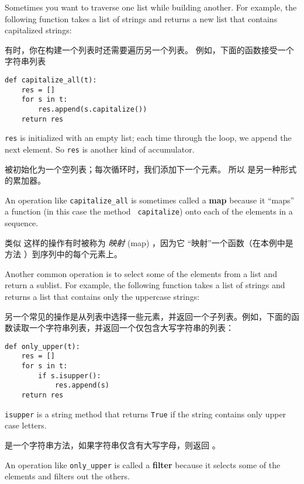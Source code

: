 Sometimes you want to traverse one list while building
another.  For example, the following function takes a list of strings
and returns a new list that contains capitalized strings:

有时，你在构建一个列表时还需要遍历另一个列表。  例如，下面的函数接受一个字符串列表

\begin{lstlisting}
def capitalize_all(t):
    res = []
    for s in t:
        res.append(s.capitalize())
    return res
\end{lstlisting}

%
{\tt res} is initialized with an empty list; each time through
the loop, we append the next element.  So {\tt res} is another
kind of accumulator.

 被初始化为一个空列表；每次循环时，我们添加下一个元素。
所以  是另一种形式的累加器。


An operation like \verb"capitalize_all" is sometimes called a {\bf
map} because it ``maps'' a function (in this case the method {\tt
capitalize}) onto each of the elements in a sequence.

类似  这样的操作有时被称为 {\em 映射} (map) ，因为它 ``映射''一个函数（在本例中是方法  ）到序列中的每个元素上。

  
  

Another common operation is to select some of the elements from
a list and return a sublist.  For example, the following
function takes a list of strings and returns a list that contains
only the uppercase strings:

另一个常见的操作是从列表中选择一些元素，并返回一个子列表。例如，下面的函数读取一个字符串列表，并返回一个仅包含大写字符串的列表：

\begin{lstlisting}
def only_upper(t):
    res = []
    for s in t:
        if s.isupper():
            res.append(s)
    return res
\end{lstlisting}

%
{\tt isupper} is a string method that returns {\tt True} if
the string contains only upper case letters.

 是一个字符串方法，如果字符串仅含有大写字母，则返回 。

An operation like \verb"only_upper" is called a {\bf filter} because
it selects some of the elements and filters out the others.

